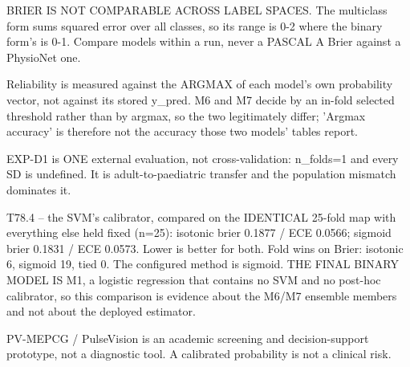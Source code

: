 \begin{table}[htbp]
  \par\footnotesize BRIER IS NOT COMPARABLE ACROSS LABEL SPACES. The multiclass form sums squared error over all classes, so its range is 0-2 where the binary form's is 0-1. Compare models within a run, never a PASCAL A Brier against a PhysioNet one.
  \par\footnotesize Reliability is measured against the ARGMAX of each model's own probability vector, not against its stored y\_pred. M6 and M7 decide by an in-fold selected threshold rather than by argmax, so the two legitimately differ; 'Argmax accuracy' is therefore not the accuracy those two models' tables report.
  \par\footnotesize EXP-D1 is ONE external evaluation, not cross-validation: n\_folds=1 and every SD is undefined. It is adult-to-paediatric transfer and the population mismatch dominates it.
  \par\footnotesize T78.4 -- the SVM's calibrator, compared on the IDENTICAL 25-fold map with everything else held fixed (n=25): isotonic brier 0.1877 / ECE 0.0566; sigmoid brier 0.1831 / ECE 0.0573. Lower is better for both. Fold wins on Brier: isotonic 6, sigmoid 19, tied 0. The configured method is sigmoid. THE FINAL BINARY MODEL IS M1, a logistic regression that contains no SVM and no post-hoc calibrator, so this comparison is evidence about the M6/M7 ensemble members and not about the deployed estimator.
  \par\footnotesize PV-MEPCG / PulseVision is an academic screening and decision-support prototype, not a diagnostic tool. A calibrated probability is not a clinical risk.
\end{table}
